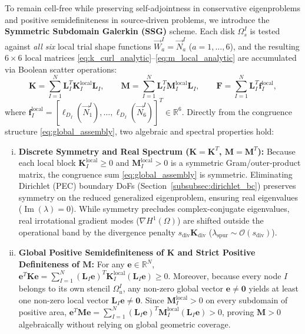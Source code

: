 \documentclass[VANCOUVER,Times1COL]{WileyNJD-v5}
\begin{document}
To remain cell-free while preserving self-adjointness in conservative eigenproblems and positive semidefiniteness in source-driven problems, we introduce the \textbf{Symmetric Subdomain Galerkin (SSG)} scheme. Each disk $\Omega_s^I$ is tested against \textit{all six} local trial shape functions $\vec{W}_a^I = \vec{N}_a^I$ ($a=1,\dots,6$), and the resulting $6 \times 6$ local matrices \eqref{eq:k_curl_analytic}--\eqref{eq:m_local_analytic} are accumulated via Boolean scatter operations:
\begin{equation}
    \mathbf{K} = \sum_{I=1}^N \mathbf{L}_I^T \mathbf{K}_I^{\mathrm{local}} \mathbf{L}_I, \qquad \mathbf{M} = \sum_{I=1}^N \mathbf{L}_I^T \mathbf{M}_I^{\mathrm{local}} \mathbf{L}_I, \qquad \mathbf{F} = \sum_{I=1}^N \mathbf{L}_I^T \mathbf{f}_I^{\mathrm{local}},
    \label{eq:global_assembly}
\end{equation}
where $\mathbf{f}_I^{\mathrm{local}} = [\ell_{D_I}(\vec{N}_1^I), \dots, \ell_{D_I}(\vec{N}_6^I)]^T \in \mathbb{R}^6$. Directly from the congruence structure \eqref{eq:global_assembly}, two algebraic and spectral properties hold:
\begin{enumerate}[(i)]
    \item \textbf{Discrete Symmetry and Real Spectrum ($\mathbf{K} = \mathbf{K}^T$, $\mathbf{M} = \mathbf{M}^T$):}
          Because each local block $\mathbf{K}_I^{\mathrm{local}} \ge 0$ and $\mathbf{M}_I^{\mathrm{local}} > 0$ is a symmetric Gram/outer-product matrix, the congruence sum \eqref{eq:global_assembly} is symmetric. Eliminating Dirichlet (PEC) boundary DoFs (Section~\ref{subsubsec:dirichlet_bc}) preserves symmetry on the reduced generalized eigenproblem, ensuring real eigenvalues ($\operatorname{Im}(\lambda) = 0$). While symmetry precludes complex-conjugate eigenvalues, real irrotational gradient modes ($\nabla H^1(\Omega)$) are shifted outside the operational band by the divergence penalty $s_{\mathrm{div}}\mathbf{K}_{\mathrm{div}}$ ($\lambda_{\mathrm{spur}} \sim \mathcal{O}(s_{\mathrm{div}})$).
    \item \textbf{Global Positive Semidefiniteness of $\mathbf{K}$ and Strict Positive Definiteness of $\mathbf{M}$:}
          For any $\mathbf{e} \in \mathbb{R}^N$, $\mathbf{e}^T \mathbf{K} \mathbf{e} = \sum_{I=1}^N (\mathbf{L}_I \mathbf{e})^T \mathbf{K}_I^{\mathrm{local}} (\mathbf{L}_I \mathbf{e}) \ge 0$. Moreover, because every node $I$ belongs to its own stencil $\Omega_u^I$, any non-zero global vector $\mathbf{e} \ne \mathbf{0}$ yields at least one non-zero local vector $\mathbf{L}_I \mathbf{e} \ne \mathbf{0}$. Since $\mathbf{M}_I^{\mathrm{local}} > 0$ on every subdomain of positive area, $\mathbf{e}^T \mathbf{M} \mathbf{e} = \sum_{I=1}^N (\mathbf{L}_I \mathbf{e})^T \mathbf{M}_I^{\mathrm{local}} (\mathbf{L}_I \mathbf{e}) > 0$, proving $\mathbf{M} > 0$ algebraically without relying on global geometric coverage.
\end{enumerate}
\end{document}
